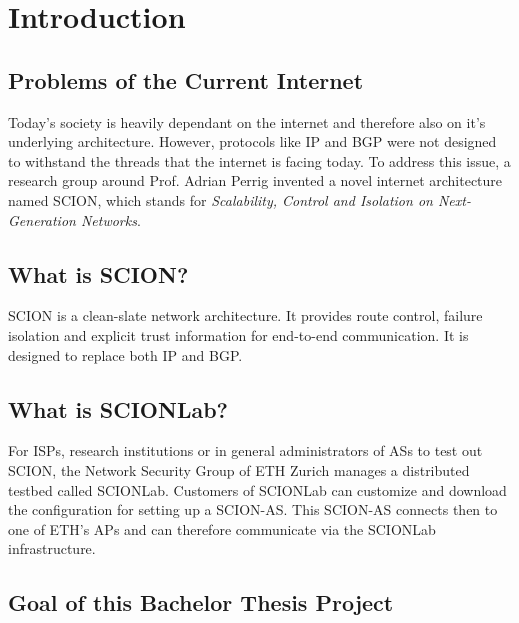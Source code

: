 \chapter{Introduction}

\section{Problems of the Current Internet}
Today's society is heavily dependant on the internet and therefore also on it's underlying architecture. However, protocols like \ac{IP} and \ac{BGP} were not designed to withstand the threads that the internet is facing today. To address this issue, a research group around Prof. Adrian Perrig invented a novel internet architecture named \ac{SCION}, which stands for \textit{Scalability, Control and Isolation on Next-Generation Networks}.

\section{What is SCION?}

\acs{SCION} is a clean-slate network architecture. It provides route control, failure isolation and explicit trust information for end-to-end communication\cite{scion2019website}. It is designed to replace both \acs{IP} and \acs{BGP}. 

\section{What is SCIONLab?}

For \acp{ISP}, research institutions or in general administrators of \acp{AS} to test out \acs{SCION}, the Network Security Group of \acs{ETH} Zurich manages a distributed testbed called \acs{SCIONLab}. Customers of \acs{SCIONLab} can customize and download the configuration for setting up a \acs{SCION}-\ac{AS}. This \acs{SCION}-\ac{AS} connects then to one of \acs{ETH}'s \aclp{AP} and can therefore communicate  via the \acs{SCIONLab} infrastructure.

\section{Goal of this Bachelor Thesis Project}

